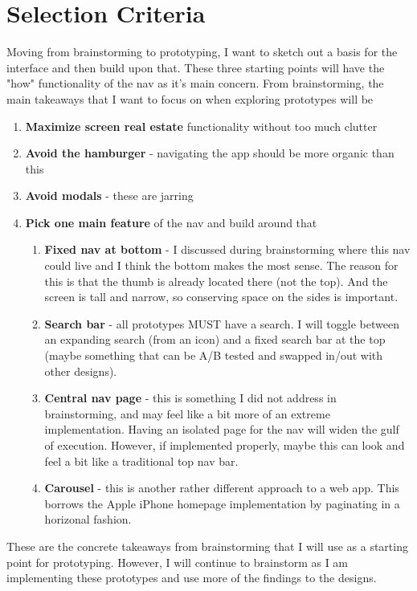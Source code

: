 \section{Selection Criteria}
Moving from brainstorming to prototyping, I want to sketch out a basis for the interface and then build upon that. These three starting points will have the "how" functionality of the nav as it's main concern. From brainstorming, the main takeaways that I want to focus on when exploring prototypes will be

\begin{enumerate}
\item
  \textbf{Maximize screen real estate} functionality without too much clutter
\item
  \textbf{Avoid the hamburger} - navigating the app should be more organic than this
\item
  \textbf{Avoid modals} - these are jarring
\item
  \textbf{Pick one main feature} of the nav and build around that
  \begin{enumerate}
  \item
    \textbf{Fixed nav at bottom} - I discussed during brainstorming where this nav could live and I think the bottom makes the most sense. The reason for this is that the thumb is already located there (not the top). And the screen is tall and narrow, so conserving space on the sides is important.
  \item
    \textbf{Search bar} - all prototypes MUST have a search. I will toggle between an expanding search (from an icon) and a fixed search bar at the top (maybe something that can be A/B tested and swapped in/out with other designs).
  \item
    \textbf{Central nav page} - this is something I did not address in brainstorming, and may feel like a bit more of an extreme implementation. Having an isolated page for the nav will widen the gulf of execution. However, if implemented properly, maybe this can look and feel a bit like a traditional top nav bar.
  \item
    \textbf{Carousel} - this is another rather different approach to a web app. This borrows the Apple iPhone homepage implementation by paginating in a horizonal fashion.
  \end{enumerate}
\end{enumerate}

These are the concrete takeaways from brainstorming that I will use as a starting point for prototyping. However, I will continue to brainstorm as I am implementing these  prototypes and use more of the findings to the designs.

